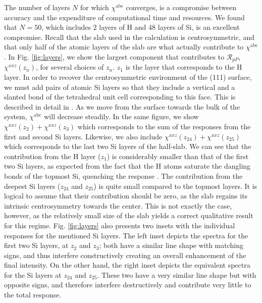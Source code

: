 \documentclass[utf8]{frontiersSCNS}
\begin{document}
The number of layers $N$ for which $\chi^{\mathrm{abc}}$ converges, is a
compromise between accuracy and the expenditure of computational time and
resources. We found that $N = 50$, which includes 2 layers of H and 48 layers of
Si, is an excellent compromise. Recall that the slab used in the calculation is
centrosymmetric, and that only half of the atomic layers of the slab are what
actually contribute to $\chi^{\mathrm{abc}}$. In Fig. \ref{fig:layers}, we show
the largest component that contributes to $\mathcal{R}_{pP}$,
$\chi^{xxz}(z_{n})$, for several choices of $z_{n}$. $z_{1}$ is the layer that
corresponds to the H layer. In order to recover the centrosymmetric environment
of the (111) surface, we must add pairs of atomic Si layers so that they include
a vertical and a slanted bond of the tetrahedral unit cell corresponding to this
face. This is described in detail in \cite{mejiaRMF04}. As we move from the
surface towards the bulk of the system, $\chi^{\mathrm{abc}}$ will decrease
steadily. In the same figure, we show $\chi^{xxz}(z_{2})+\chi^{xxz}(z_{3})$
which corresponds to the sum of the responses from the first and second Si
layers. Likewise, we also include $\chi^{xxz}(z_{24})+\chi^{xxz}(z_{25})$ which
corresponds to the last two Si layers of the half-slab. We can see that the
contribution from the H layer ($z_{1}$) is considerably smaller than that of the
first two Si layers, as expected from the fact that the H atoms saturate the
dangling bonds of the topmost Si, quenching the response \citep{mejiaPRB02}. The
contribution from the deepest Si layers ($z_{24}$ and $z_{25}$) is quite small
compared to the topmost layers. It is logical to assume that their contribution
should be zero, as the slab regains its intrinsic centrosymmetry towards the
center. This is not exactly the case, however, as the relatively small size of
the slab yields a correct qualitative result for this regime. Fig.
\ref{fig:layers} also presents two insets with the individual responses for the
mentioned Si layers. The left inset depicts the spectra for the first two Si
layers, at $z_{2}$ and $z_{3}$; both have a similar line shape with matching
signs, and thus interfere constructively creating an overall enhancement of the
final intensity. On the other hand, the right inset depicts the equivalent
spectra for the Si layers at $z_{24}$ and $z_{25}$. These two have a very
similar line shape but with opposite signs, and therefore interfere
destructively and contribute very little to the total response.
\end{document}
